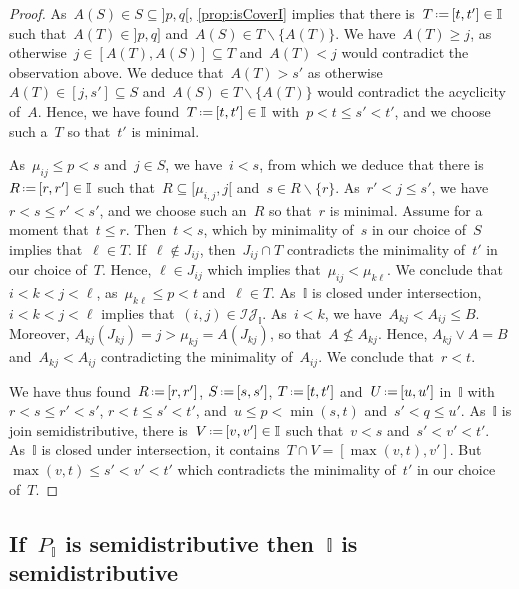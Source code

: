 \documentclass{amsart}
\theoremstyle{definition}
\newcommand{\cal}[1]{\mathcal{#1}} %
\newcommand{\ssm}{\smallsetminus} %
\newcommand{\eqdef}{\mbox{\,\raisebox{0.2ex}{\scriptsize\ensuremath{\mathrm:}}\ensuremath{=}\,}} %
\newcommand{\join}{\vee} %
\newcommand{\II}{\mathbb I} %
\newcommand{\cIJ}{\cal{IJ}} %
\begin{document}
\begin{proof}
As~$A(S) \in S \subseteq {]p,q[}$, \cref{prop:isCoverI} implies that there is~$T \eqdef [t,t'] \in \II$ such that~${A(T) \in {]p,q]}}$ and~$A(S) \in T \ssm \{A(T)\}$.
We have~$A(T) \ge j$, as otherwise~${j \in [A(T), A(S)] \subseteq T}$ and~$A(T) < j$ would contradict the observation above.
We deduce that~$A(T) > s'$ as otherwise~$A(T) \in [j, s'] \subseteq S$ and~$A(S) \in T \ssm \{A(T)\}$ would contradict the acyclicity of~$A$.
Hence, we have found~$T \eqdef [t,t'] \in \II$ with~$p < t \le s' < t'$, and we choose such a~$T$ so that~$t'$ is minimal.

As~$\mu_{ij} \le p < s$ and~$j \in S$, we have~$i < s$, from which we deduce that there is~$R \eqdef [r,r'] \in \II$ such that~$R \subseteq {[\mu_{i,j},j [}$ and~$s \in R \ssm \{r\}$.
As~$r' < j \le s'$, we have~$r < s \le r' < s'$, and we choose such an~$R$ so that~$r$ is minimal.
Assume for a moment that~$t \le r$.
Then~$t < s$, which by minimality of~$s$ in our choice of~$S$ implies that~$\ell \in T$.
If~$\ell \notin J_{ij}$, then~$J_{ij} \cap T$ contradicts the minimality of~$t'$ in our choice of~$T$.
Hence, $\ell \in J_{ij}$ which implies that~$\mu_{ij} < \mu_{k\ell}$.
We conclude that~$i < k < j < \ell$, as~$\mu_{k\ell} \le p < t$ and~$\ell \in T$.
As~$\II$ is closed under intersection, $i < k < j < \ell$ implies that~$(i,j) \in \cIJ_\II$.
As~$i < k$, we have~$A_{kj} < A_{ij} \le B$.
Moreover, $A_{kj}(J_{kj}) = j > \mu_{kj} = A(J_{kj})$, so that~$A \not\le A_{kj}$.
Hence, $A_{kj} \join A = B$ and~$A_{kj} < A_{ij}$ contradicting the minimality of~$A_{ij}$.
We conclude that~$r < t$.

We have thus found~$R \eqdef [r,r']$, $S \eqdef [s,s']$, $T \eqdef [t,t']$ and~$U \eqdef [u,u']$ in~$\II$ with~$r < s \le r' < s'$, $r < t \le s' < t'$, and~$u \le p < \min(s,t)$ and~$s' < q \le u'$.
As~$\II$ is join semidistributive, there is~$V \eqdef [v,v'] \in \II$ such that~$v < s$ and~$s' < v' < t'$.
As~$\II$ is closed under intersection, it contains~$T \cap V = [\max(v,t), v']$.
But~$\max(v,t) \le s' < v' < t'$ which contradicts the minimality of~$t'$ in our choice of~$T$.
\end{proof}


\subsection{If~$P_\II$ is semidistributive then~$\II$ is semidistributive}
\label{subsec:semidistributiveLatticeForward}
\end{document}
